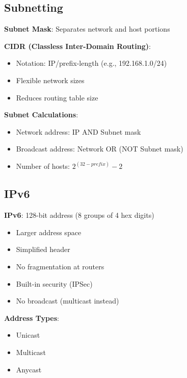 \documentclass[12pt,a4paper]{report}
\begin{document}
\subsection{Subnetting}
\begin{concept}
\textbf{Subnet Mask}: Separates network and host portions

\textbf{CIDR (Classless Inter-Domain Routing)}:
\begin{itemize}
    \item Notation: IP/prefix-length (e.g., 192.168.1.0/24)
    \item Flexible network sizes
    \item Reduces routing table size
\end{itemize}

\textbf{Subnet Calculations}:
\begin{itemize}
    \item Network address: IP AND Subnet mask
    \item Broadcast address: Network OR (NOT Subnet mask)
    \item Number of hosts: $2^{(32-prefix)} - 2$
\end{itemize}
\end{concept}

\subsection{IPv6}
\begin{concept}
\textbf{IPv6}: 128-bit address (8 groups of 4 hex digits)
\begin{itemize}
    \item Larger address space
    \item Simplified header
    \item No fragmentation at routers
    \item Built-in security (IPSec)
    \item No broadcast (multicast instead)
\end{itemize}

\textbf{Address Types}:
\begin{itemize}
    \item Unicast
    \item Multicast
    \item Anycast
\end{itemize}
\end{concept}
\end{document}
